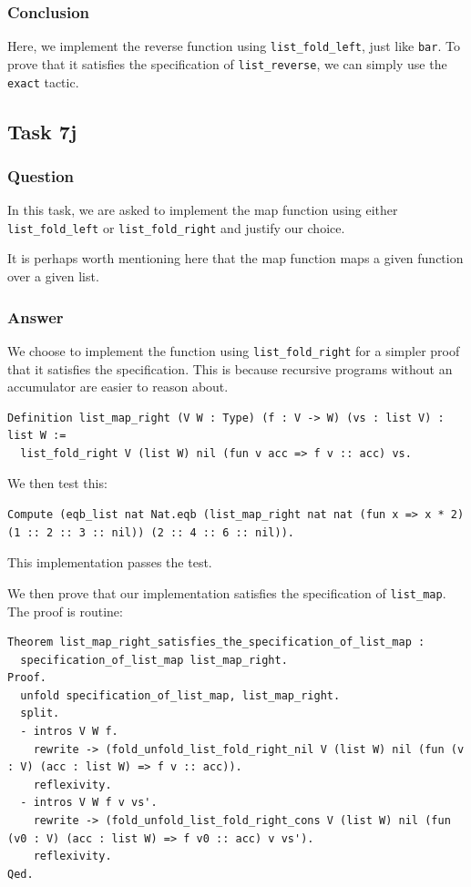 \documentclass{article}
\begin{document}
\subsubsection{Conclusion}
Here, we implement the reverse function using \texttt{list\_fold\_left}, just like \texttt{bar}. To prove that it satisfies the specification of \texttt{list\_reverse}, we can simply use the \texttt{exact} tactic.

\subsection{Task 7j}

\subsubsection{Question}
In this task, we are asked to implement the map function using either \texttt{list\_fold\_left} or \texttt{list\_fold\_right} and justify our choice.

It is perhaps worth mentioning here that the map function maps a given function over a given list.

\subsubsection{Answer}
We choose to implement the function using \texttt{list\_fold\_right} for a simpler proof that it satisfies the specification. This is because recursive programs without an accumulator are easier to reason about. 

\begin{lstlisting}
Definition list_map_right (V W : Type) (f : V -> W) (vs : list V) : list W :=
  list_fold_right V (list W) nil (fun v acc => f v :: acc) vs.
\end{lstlisting}

We then test this:

\begin{lstlisting}
Compute (eqb_list nat Nat.eqb (list_map_right nat nat (fun x => x * 2) (1 :: 2 :: 3 :: nil)) (2 :: 4 :: 6 :: nil)).
\end{lstlisting}

This implementation passes the test.

We then prove that our implementation satisfies the specification of \texttt{list\_map}. The proof is routine:

\begin{lstlisting}
Theorem list_map_right_satisfies_the_specification_of_list_map :
  specification_of_list_map list_map_right.
Proof.
  unfold specification_of_list_map, list_map_right.
  split.
  - intros V W f.
    rewrite -> (fold_unfold_list_fold_right_nil V (list W) nil (fun (v : V) (acc : list W) => f v :: acc)).
    reflexivity.
  - intros V W f v vs'.
    rewrite -> (fold_unfold_list_fold_right_cons V (list W) nil (fun (v0 : V) (acc : list W) => f v0 :: acc) v vs').
    reflexivity.
Qed.
\end{lstlisting}
\end{document}
